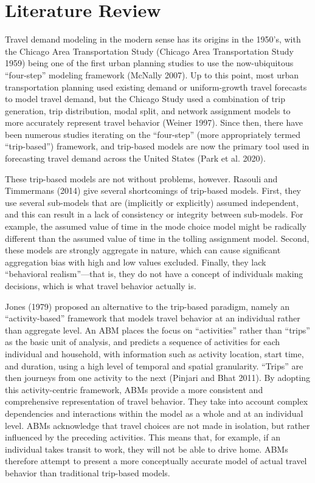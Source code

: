 \documentclass[fancy, oneside, mastersfancy, ms]{byuthesis}
\begin{document}
\chapter{Literature Review}\label{sec-literature}

Travel demand modeling in the modern sense has its origins in the
1950's, with the Chicago Area Transportation Study (Chicago Area
Transportation Study 1959) being one of the first urban planning studies
to use the now-ubiquitous ``four-step'' modeling framework (McNally
2007). Up to this point, most urban transportation planning used
existing demand or uniform-growth travel forecasts to model travel
demand, but the Chicago Study used a combination of trip generation,
trip distribution, modal split, and network assignment models to more
accurately represent travel behavior (Weiner 1997). Since then, there
have been numerous studies iterating on the ``four-step'' (more
appropriately termed ``trip-based'') framework, and trip-based models
are now the primary tool used in forecasting travel demand across the
United States (Park et al. 2020).

These trip-based models are not without problems, however. Rasouli and
Timmermans (2014) give several shortcomings of trip-based models. First,
they use several sub-models that are (implicitly or explicitly) assumed
independent, and this can result in a lack of consistency or integrity
between sub-models. For example, the assumed value of time in the mode
choice model might be radically different than the assumed value of time
in the tolling assignment model. Second, these models are strongly
aggregate in nature, which can cause significant aggregation bias with
high and low values excluded. Finally, they lack ``behavioral
realism''---that is, they do not have a concept of individuals making
decisions, which is what travel behavior actually is.

Jones (1979) proposed an alternative to the trip-based paradigm, namely
an ``activity-based'' framework that models travel behavior at an
individual rather than aggregate level. An ABM places the focus on
``activities'' rather than ``trips'' as the basic unit of analysis, and
predicts a sequence of activities for each individual and household,
with information such as activity location, start time, and duration,
using a high level of temporal and spatial granularity. ``Trips'' are
then journeys from one activity to the next (Pinjari and Bhat 2011). By
adopting this activity-centric framework, ABMs provide a more consistent
and comprehensive representation of travel behavior. They take into
account complex dependencies and interactions within the model as a
whole and at an individual level. ABMs acknowledge that travel choices
are not made in isolation, but rather influenced by the preceding
activities. This means that, for example, if an individual takes transit
to work, they will not be able to drive home. ABMs therefore attempt to
present a more conceptually accurate model of actual travel behavior
than traditional trip-based models.
\end{document}
